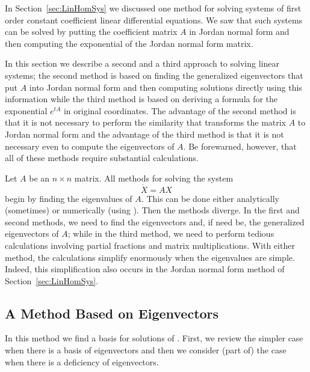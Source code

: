 \label{S:SEOC}

In Section~\ref{sec:LinHomSys} we discussed one method for solving systems of 
first order constant coefficient linear differential equations.   We saw that 
such systems can be solved by putting the coefficient matrix $A$ in Jordan 
normal form and then computing the exponential of the Jordan normal form 
matrix.  

In this section we describe a second and a third approach to solving linear 
systems; the second method is based on finding the generalized eigenvectors 
that put $A$ into Jordan normal form and then
computing solutions directly using this information while the third method is 
based on deriving a formula for the exponential 
$e^{tA}$ in original coordinates.  The advantage of the second method is
that it is not necessary to perform the similarity that transforms the matrix 
$A$ to Jordan normal form and the advantage of the third method is that it is 
not necessary even to compute the eigenvectors of $A$.  Be forewarned,
however, that all of these methods require substantial calculations.

Let $A$ be an $n\times n$ matrix.  All methods for solving the system 
\begin{equation} \label{dotX=AX}
\dot{X}=AX
\end{equation}
begin by finding the eigenvalues of $A$.  This can be done 
either analytically (sometimes) or numerically (using \Matlabp). Then the  
methods diverge.  In the first and second methods, we need to find the 
eigenvectors and, if need be, the generalized eigenvectors
 of $A$; while in the third method, we need to 
perform tedious calculations involving partial fractions and matrix 
multiplications.  With either method, the calculations simplify enormously 
when the eigenvalues are simple.  Indeed, this simplification also occurs in 
the Jordan normal form method of Section~\ref{sec:LinHomSys}.

\subsection*{A Method Based on Eigenvectors}
 
In this method we find a basis for solutions of .  First, we 
review the simpler case when there is a basis of eigenvectors and then we 
consider (part of) the case when there is a deficiency of eigenvectors.

